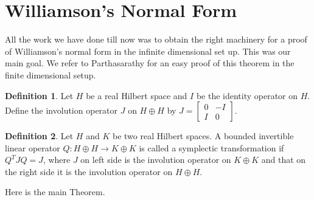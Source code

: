\documentclass[12pt,a4paper,twoside]{article}
\numberwithin{equation}{section}
\theoremstyle{definition}  %
\newtheorem{defn}{Definition}[section]
\theoremstyle{plain}  %
\theoremstyle{remark} %
\begin{document}
\section{Williamson's Normal Form}

All the work we have done till now was to obtain the right machinery for a proof of Williamson's normal form in the infinite dimensional set up.  This was our main goal. We refer to Parthasarathy \cite{Par13} for an easy proof of this theorem in the finite dimensional setup. 
\begin{defn}\label{def:J-operator}
  Let $H$ be a real Hilbert space and $I$ be the identity operator on $H$. Define the involution operator $J$ on $H \oplus H$ by
$J = \begin{bmatrix}
         0 & -I\\
         I & 0
     \end{bmatrix}.$
\end{defn}

\begin{defn}
 Let $H$ and $K$ be two real Hilbert spaces. A bounded invertible linear operator $Q \colon H\oplus H \to K\oplus K $  is called a symplectic transformation if $Q^{T}JQ = J$, where $J$ on left side is the involution operator on $K\oplus K$ and that on the right side it is the involution operator on $ H\oplus H$.
\end{defn}

Here is the main Theorem.
\end{document}
